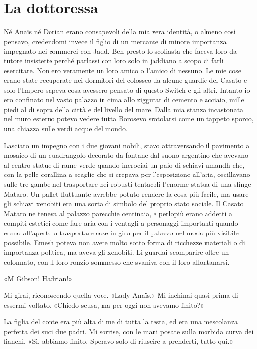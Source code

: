 \chapter{La dottoressa}

Né Anaïs né Dorian erano consapevoli della mia vera identità, o almeno
così pensavo, credendomi invece il figlio di un mercante di minore
importanza impegnato nei commerci con Jadd. Ben presto lo scoliasta che
faceva loro da tutore insistette perché parlassi con loro solo in
jaddiano a scopo di farli esercitare. Non ero veramente un loro amico o
l'amico di nessuno. Le mie cose erano state recuperate nei dormitori del
colosseo da alcune guardie del Casato e solo l'Impero sapeva cosa
avessero pensato di questo Switch e gli altri. Intanto io ero confinato
nel vasto palazzo in cima allo ziggurat di cemento e acciaio, mille
piedi al di sopra della città e del livello del mare. Dalla mia stanza
incastonata nel muro esterno potevo vedere tutta Borosevo srotolarsi
come un tappeto sporco, una chiazza sulle verdi acque del mondo.

Lasciato un impegno con i due giovani nobili, stavo attraversando il
pavimento a mosaico di un quadrangolo decorato da fontane dal suono
argentino che avevano al centro statue di rame verde quando incrociai un
paio di schiavi umandh che, con la pelle corallina a scaglie che si
crepava per l'esposizione all'aria, oscillavano sulle tre gambe nel
trasportare nei robusti tentacoli l'enorme statua di una sfinge Mataro.
Un pallet fluttuante avrebbe potuto rendere la cosa più facile, ma usare
gli schiavi xenobiti era una sorta di simbolo del proprio stato sociale.
Il Casato Mataro ne teneva al palazzo parecchie centinaia, e perlopiù
erano addetti a compiti estetici come fare aria con i ventagli a
personaggi importanti quando erano all'aperto o trasportare cose in giro
per il palazzo nel modo più visibile possibile. Emesh poteva non avere
molto sotto forma di ricchezze materiali o di importanza politica, ma
aveva gli xenobiti. Li guardai scomparire oltre un colonnato, con il
loro ronzio sommesso che svaniva con il loro allontanarsi.

«M Gibson! Hadrian!»

Mi girai, riconoscendo quella voce. «Lady Anaïs.» Mi inchinai quasi
prima di essermi voltato. «Chiedo scusa, ma per oggi non avevamo
finito?»

La figlia del conte era più alta di me di tutta la testa, ed era una
mescolanza perfetta dei suoi due padri. Mi sorrise, con le mani posate
sulla morbida curva dei fianchi. «Sì, abbiamo finito. Speravo solo di
riuscire a prenderti, tutto qui.»

